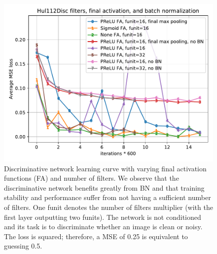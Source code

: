 \begin{figure}[!htbp]
\centering
\includegraphics[width=1\linewidth]{gfx/graphs/hul112disc-activ.pdf}
\caption[Discriminative network learning curve with different final activation functions and number of filters]{Discriminative network learning curve with varying final activation functions (FA) and number of filters. We observe that the discriminative network benefits greatly from \ac{BN} and that training stability and performance suffer from not having a sufficient number of filters. One funit denotes the number of filters multiplier (with the first layer outputting two funits). The network is not conditioned and its task is to discriminate whether an image is clean or noisy. The loss is squared; therefore, a \ac{MSE} of 0.25 is equivalent to guessing 0.5.}
\label{fig:hul112disc-activ}
\end{figure}

